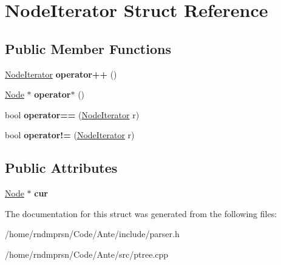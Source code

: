 \hypertarget{structNodeIterator}{}\section{Node\+Iterator Struct Reference}
\label{structNodeIterator}
\subsection*{Public Member Functions}
\begin{DoxyCompactItemize}
\item 
\mbox{\label{structNodeIterator_a9241b5682e6021a4d9154629c2dc8a05}} 
\hyperlink{structNodeIterator}{Node\+Iterator} {\bfseries operator++} ()
\item 
\mbox{\label{structNodeIterator_a803b7a02f66621be46044937d4a119c7}} 
\hyperlink{structNode}{Node} $\ast$ {\bfseries operator$\ast$} ()
\item 
\mbox{\label{structNodeIterator_a93cdfc1747402c0106a684ce3f4265ad}} 
bool {\bfseries operator==} (\hyperlink{structNodeIterator}{Node\+Iterator} r)
\item 
\mbox{\label{structNodeIterator_a2c5e8390dddfcdaded7ddced41e45076}} 
bool {\bfseries operator!=} (\hyperlink{structNodeIterator}{Node\+Iterator} r)
\end{DoxyCompactItemize}
\subsection*{Public Attributes}
\begin{DoxyCompactItemize}
\item 
\mbox{\label{structNodeIterator_a3af00d1c6a186001f3b73d475a255540}} 
\hyperlink{structNode}{Node} $\ast$ {\bfseries cur}
\end{DoxyCompactItemize}


The documentation for this struct was generated from the following files\+:\begin{DoxyCompactItemize}
\item 
/home/rndmprsn/\+Code/\+Ante/include/parser.\+h\item 
/home/rndmprsn/\+Code/\+Ante/src/ptree.\+cpp\end{DoxyCompactItemize}
